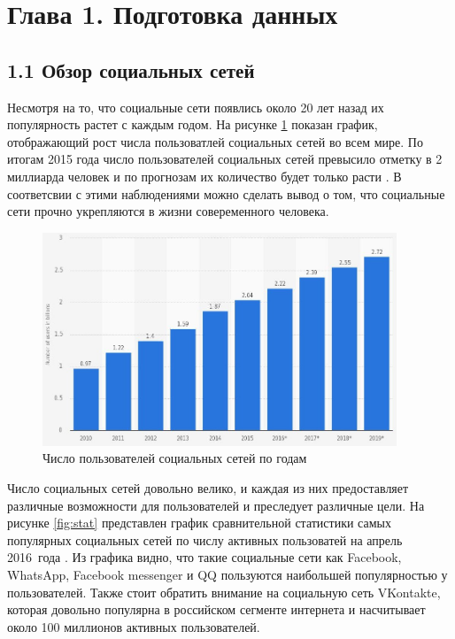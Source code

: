 \documentclass[a4paper]{report}
\begin{document}
	
	
	
	\section{Глава 1. Подготовка данных}
	\subsection{1.1 Обзор социальных сетей}
	
	
	
	Несмотря на то, что социальные сети появлись около 20 лет назад их популярность растет с каждым годом. На рисунке \ref{fig:popularity}  показан график, отображающий рост числа пользоватлей социальных сетей во всем мире. По итогам 2015 года число пользователей социальных сетей превысило отметку в 2 миллиарда человек и по прогнозам их количество будет только расти \cite{bib:Popularity}. В соответсвии с этими наблюдениями можно сделать вывод о том, что социальные сети прочно укрепляются в жизни совеременного человека.
	\newline
	\newline
	\begin{figure}[h]
		
		\centering
		\includegraphics[width=400px]
		{imgs/Popularity.jpg}
		\caption{Число пользователей социальных сетей по годам}
		\label{fig:popularity}
	\end{figure}
	\newline
	\newline
	
	
	
	Число социальных сетей довольно велико, и каждая из них предоставляет различные возможности для пользователей и преследует различные цели.  На рисунке \ref{fig:stat} представлен график сравнительной статистики самых популярных социальных сетей по числу активных пользоватей на апрель 2016~года  \cite{bib:PopularNetwork}. Из графика видно, что такие социальные сети как Facebook, WhatsApp, Facebook messenger и QQ пользуются наибольшей популярностью у пользователей. 	
	Также стоит обратить внимание на социальную сеть VKontakte, которая довольно популярна в российском сегменте интернета и насчитывает около 100 миллионов активных пользователей.
	
\end{document}
